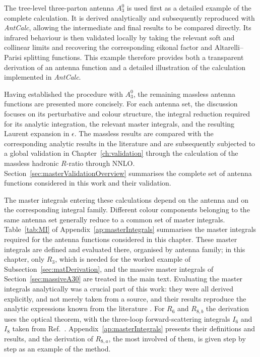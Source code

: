The tree-level three-parton antenna $A_3^0$ is used first as a detailed example of the complete
calculation. It is derived analytically and subsequently reproduced with \textit{AntCalc}, allowing
the intermediate and final results to be compared directly. Its infrared behaviour is then validated
locally by taking the relevant soft and collinear limits and recovering the corresponding eikonal
factor and Altarelli--Parisi splitting functions. This example therefore provides both a transparent
derivation of an antenna function and a detailed illustration of the calculation implemented in
\textit{AntCalc}.

Having established the procedure with $A_3^0$, the remaining massless antenna functions are
presented more concisely. For each antenna set, the discussion focuses on its perturbative and
colour structure, the integral reduction required for its analytic integration, the relevant master
integrals, and the resulting Laurent expansion in $\epsilon$. The massless results are compared with
the corresponding analytic results in the literature and are subsequently subjected to a global
validation in Chapter~\ref{ch:validation} through the calculation of the massless hadronic $R$-ratio
through NNLO. Section~\ref{sec:masterValidationOverview} summarises the complete set of antenna
functions considered in this work and their validation.

The master integrals entering these calculations depend on the antenna and on the corresponding
integral family. Different colour components belonging to the same antenna set generally reduce to a
common set of master integrals. Table~\ref{tab:MI} of Appendix~\ref{ap:masterIntegrals} summarises the
master integrals required for the antenna functions considered in this chapter. These master integrals
are defined and evaluated there, organised by antenna family; in this chapter, only $R_3$,
which is needed for the worked example of Subsection~\ref{sec:matDerivation}, and the massive master
integrals of Section~\ref{sec:massiveA30} are treated in the main text.
Evaluating the master integrals analytically was a crucial part of this work: they were all
derived explicitly, and not merely taken from a source, and their results reproduce the analytic
expressions known from the literature \cite{Gehrmann-DeRidder:2005btv,GehrmannDeRidder0311276,GehrmannDeRidder:2009fz}.
For $R_6$ and $R_{8,b}$ the derivation uses the optical theorem, with the three-loop
forward-scattering integrals $I_6$ and $I_8$ taken from Ref.~\cite{GehrmannDeRidder0311276}.
Appendix~\ref{ap:masterIntegrals} presents their definitions and results, and the derivation of
$R_{8,a}$, the most involved of them, is given step by step as an example of the method.

